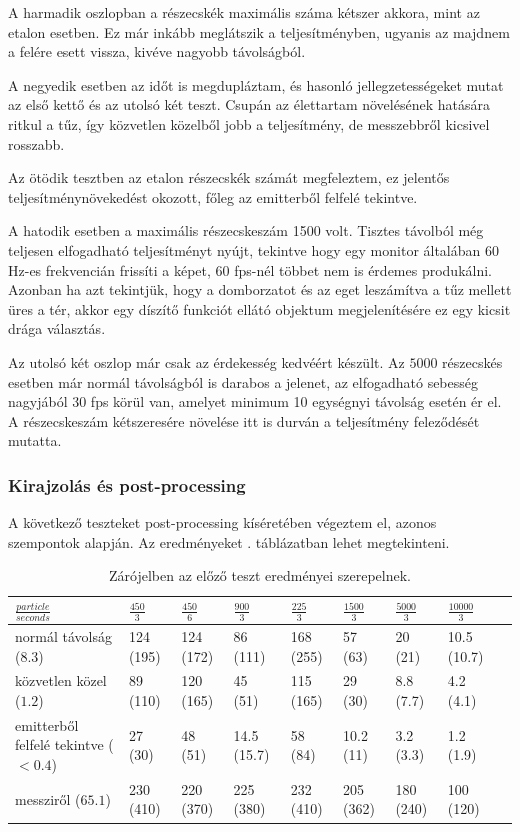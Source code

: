 A harmadik oszlopban a részecskék maximális száma kétszer akkora, mint az etalon esetben. Ez már inkább meglátszik a teljesítményben, ugyanis az majdnem a felére esett vissza, kivéve nagyobb távolságból.

A negyedik esetben az időt is megdupláztam, és hasonló jellegzetességeket mutat az első kettő és az utolsó két teszt. Csupán az élettartam növelésének hatására ritkul a tűz, így közvetlen közelből jobb a teljesítmény, de messzebbről kicsivel rosszabb. 

Az ötödik tesztben az etalon részecskék számát megfeleztem, ez jelentős teljesítménynövekedést okozott, főleg az emitterből felfelé tekintve.

A hatodik esetben a maximális részecskeszám 1500 volt. Tisztes távolból még teljesen elfogadható teljesítményt nyújt, tekintve hogy egy monitor általában 60 Hz-es frekvencián frissíti a képet, 60 fps-nél többet nem is érdemes produkálni. Azonban ha azt tekintjük, hogy a domborzatot és az eget leszámítva a tűz mellett üres a tér, akkor egy díszítő funkciót ellátó objektum megjelenítésére ez egy kicsit drága választás.

Az utolsó két oszlop már csak az érdekesség kedvéért készült. Az $5000$ részecskés esetben már normál távolságból is darabos a jelenet, az elfogadható sebesség nagyjából 30 fps körül van, amelyet minimum 10 egységnyi távolság esetén ér el. A részecskeszám kétszeresére növelése itt is durván a teljesítmény feleződését mutatta.

\subsubsection{Kirajzolás és post-processing}
A következő teszteket post-processing kíséretében végeztem el, azonos szempontok alapján. Az eredményeket . táblázatban lehet megtekinteni.

\begin{table}[h!]
\centering
\begin{tabular}{ m{10em}|C{1cm}|C{1cm}|C{1cm}|C{1cm}|C{1cm}|C{1cm}|C{1cm}|C{1cm}| } 
 $\frac{particle}{seconds}$ & $\frac{450}{3}$ & $\frac{450}{6}$ & $\frac{900}{3}$ & $\frac{225}{3}$ & $\frac{1500}{3}$ & $\frac{5000}{3}$ & $\frac{10000}{3}$ \\  \hline
 
 normál távolság ($8.3$)                   & 124  (195) & 124 (172)  & 86 (111)     & 168 (255)  & 57 (63)     & 20 (21) & 10.5 (10.7) \\  \hline
 közvetlen közel ($1.2$)                    & 89 (110)   & 120 (165)  & 45 (51)       & 115 (165)  & 29 (30)     & 8.8 (7.7) & 4.2 (4.1) \\  \hline
 emitterből felfelé tekintve ($<0.4$) & 27 (30)     &  48 (51)    & 14.5 (15.7) & 58 (84)      & 10.2 (11)  & 3.2 (3.3) & 1.2 (1.9)  \\ \hline
 messziről ($65.1$)                            & 230 (410) &  220 (370) & 225 (380)   & 232 (410)  & 205 (362)   & 180 (240) & 100 (120) \\ 
 \hline
\end{tabular}
\caption{Zárójelben az előző teszt eredményei szerepelnek.}
\label{table:2}
\end{table}

